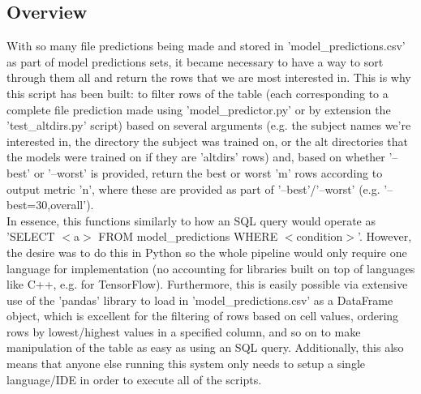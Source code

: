 \documentclass[12pt,twoside]{report}
\begin{document}
\subsection{Overview}

\quad With so many file predictions being made and stored in 'model\_predictions.csv' as part of model predictions sets, it became necessary to have a way to sort through them all and return the rows that we are most interested in. This is why this script has been built: to filter rows of the table (each corresponding to a complete file prediction made using 'model\_predictor.py' or by extension the 'test\_altdirs.py' script) based on several arguments (e.g. the subject names we're interested in, the directory the subject was trained on, or the alt directories that the models were trained on if they are 'altdirs' rows) and, based on whether '--best' or '--worst' is provided, return the best or worst 'm' rows according to output metric 'n', where these are provided as part of '--best'/'--worst' (e.g. '--best=30,overall').\\

\quad In essence, this functions similarly to how an SQL query would operate as 'SELECT $<$a$>$ FROM model\_predictions WHERE $<$condition$>$’. However, the desire was to do this in Python so the whole pipeline would only require one language for implementation (no accounting for libraries built on top of languages like C++, e.g. for TensorFlow). Furthermore, this is easily possible via extensive use of the 'pandas' library to load in 'model\_predictions.csv' as a DataFrame object, which is excellent for the filtering of rows based on cell values, ordering rows by lowest/highest values in a specified column, and so on to make manipulation of the table as easy as using an SQL query. Additionally, this also means that anyone else running this system only needs to setup a single language/IDE in order to execute all of the scripts.\\
\end{document}
